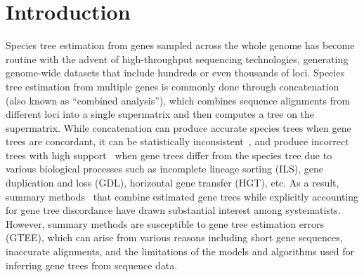 \documentclass[runningheads]{llncs}
\begin{document}
\begin{abstract}





\end{abstract}
%
%
%



\section{Introduction}
Species tree estimation from genes sampled across the whole genome has become routine with the advent of high-throughput sequencing technologies, generating genome-wide datasets that include hundreds or even thousands of loci. Species tree estimation from multiple genes is commonly done through concatenation (also known as ``combined analysis''), which combines sequence alignments from different loci into a single supermatrix and then computes a tree on the supermatrix. While concatenation can produce accurate species trees when gene trees are concordant, it can be statistically inconsistent~\cite{roch2015likelihood,consensus-inconsistent}, and produce incorrect trees with high support~\cite{kubatko-degnan-2007} when gene trees differ from the species tree due to various biological processes such as incomplete lineage sorting (ILS), gene duplication and loss (GDL), horizontal gene transfer (HGT), etc. As a result, summary methods~\cite{mpest,astral,larget-bioinf2010,glass,stem,svdquartet,steac,njst,wqfm,astrid,stelar} that combine estimated gene trees while explicitly accounting for gene tree discordance have drawn substantial interest among systematists. However, summary methods are susceptible to gene tree estimation errors (GTEE), which can arise from various reasons including short gene sequences, inaccurate alignments, and the limitations of the models and algorithms used for inferring gene trees from sequence data. 
\end{document}
